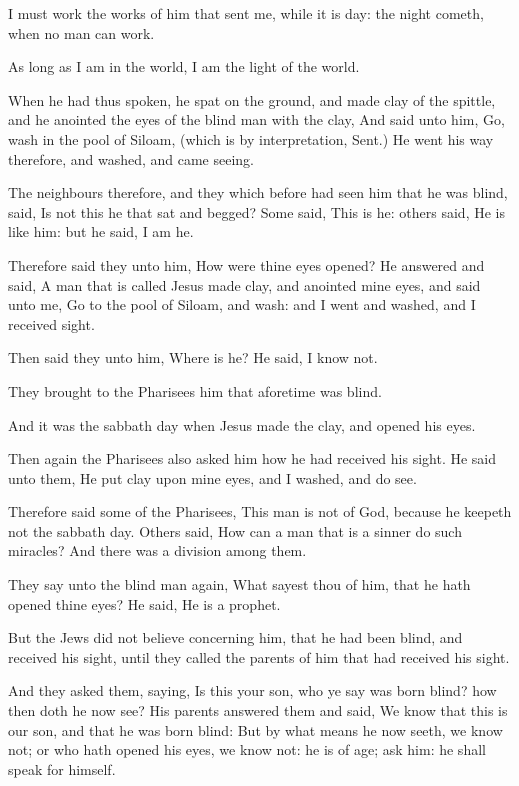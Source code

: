 \verse I must work the works of him that sent me, while it is day: the night cometh, when no man can work.

\verse As long as I am in the world, I am the light of the world.

\verse When he had thus spoken, he spat on the ground, and made clay of the spittle, and he anointed the eyes of the blind man with the clay, \verse And said unto him, Go, wash in the pool of Siloam, (which is by interpretation, Sent.) He went his way therefore, and washed, and came seeing.

\verse The neighbours therefore, and they which before had seen him that he was blind, said, Is not this he that sat and begged?  \verse Some said, This is he: others said, He is like him: but he said, I am he.

\verse Therefore said they unto him, How were thine eyes opened?  \verse He answered and said, A man that is called Jesus made clay, and anointed mine eyes, and said unto me, Go to the pool of Siloam, and wash: and I went and washed, and I received sight.

\verse Then said they unto him, Where is he? He said, I know not.

\verse They brought to the Pharisees him that aforetime was blind.

\verse And it was the sabbath day when Jesus made the clay, and opened his eyes.

\verse Then again the Pharisees also asked him how he had received his sight. He said unto them, He put clay upon mine eyes, and I washed, and do see.

\verse Therefore said some of the Pharisees, This man is not of God, because he keepeth not the sabbath day. Others said, How can a man that is a sinner do such miracles? And there was a division among them.

\verse They say unto the blind man again, What sayest thou of him, that he hath opened thine eyes? He said, He is a prophet.

\verse But the Jews did not believe concerning him, that he had been blind, and received his sight, until they called the parents of him that had received his sight.

\verse And they asked them, saying, Is this your son, who ye say was born blind? how then doth he now see?  \verse His parents answered them and said, We know that this is our son, and that he was born blind: \verse But by what means he now seeth, we know not; or who hath opened his eyes, we know not: he is of age; ask him: he shall speak for himself.

